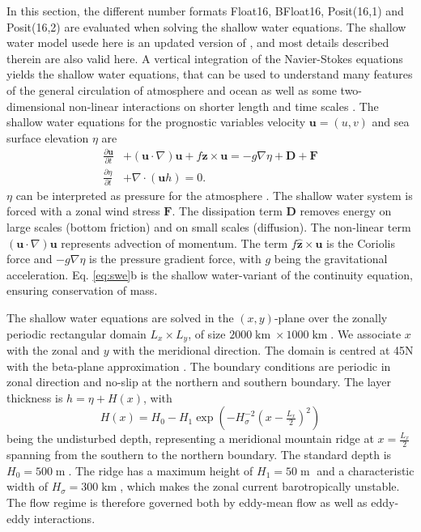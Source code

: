\documentclass[draft]{agujournal2019}
\newcommand{\op}{\operatorname}
\begin{document}
In this section, the different number formats Float16, BFloat16, Posit(16,1) and
Posit(16,2) are evaluated when solving the shallow water equations. The shallow
water model usede here is an updated version of , and most details
described therein are also valid here. A vertical integration of the Navier-Stokes
equations yields the shallow water equations, that can be used to understand
many features of the general circulation of atmosphere and ocean as well as
some two-dimensional non-linear interactions on shorter length and time scales
\cite{Gill1982,Vallis2006}. The shallow water equations for the prognostic variables
velocity $\mathbf{u} = (u,v)$ and sea surface elevation $\eta$ are
\begin{subequations}
\begin{align}
\frac{\partial \mathbf{u}}{\partial t} &+ (\mathbf{u} \cdot \nabla) \mathbf{u} +
f\hat{\mathbf{z}} \times \mathbf{u} = -g\nabla \eta + \mathbf{D} + \mathbf{F} \\
\frac{\partial \eta}{\partial t} &+ \nabla \cdot (\mathbf{u}h) = 0.
\end{align}
\label{eq:swe}%
\end{subequations}
$\eta$ can be interpreted as pressure for the atmosphere \cite{Gill1982}.
The shallow water system is forced with a zonal wind stress $\mathbf{F}$.
The dissipation term $\mathbf{D}$ removes energy on large scales (bottom friction)
and on small scales (diffusion). The non-linear term $(\mathbf{u} \cdot \nabla) \mathbf{u}$
represents advection of momentum. The term $f\hat{\mathbf{z}} \times \mathbf{u}$
is the Coriolis force and $-g\nabla \eta$ is the pressure gradient force, with
$g$ being the gravitational acceleration. Eq. \ref{eq:swe}b is the shallow
water-variant of the continuity equation, ensuring conservation of mass.

The shallow water equations are solved in the $(x,y)$-plane over the zonally periodic
rectangular domain $L_x \times L_y$, of size $2000\op{km} \times 1000\op{km}$.
We associate $x$ with the zonal and $y$ with the meridional direction. The domain
is centred at 45N with the beta-plane approximation \cite{Vallis2006}. The boundary
conditions are periodic in zonal direction and no-slip at the northern and southern
boundary. The layer thickness is $h = \eta + H(x)$, with
\begin{equation}
H(x) = H_0 - H_1\exp\left(-H_\sigma^{-2}(x-\tfrac{L_x}{2})^2\right)
\end{equation}
being the undisturbed depth, representing a meridional mountain ridge at
$x=\tfrac{L_x}{2}$ spanning from the southern to the northern boundary.
The standard depth is $H_0 = 500\op{m}$. The ridge has a maximum height of
$H_1 = 50\op{m}$ and a characteristic width of $H_\sigma = 300\op{km}$, which
makes the zonal current barotropically unstable. The flow regime is therefore
governed both by eddy-mean flow as well as eddy-eddy interactions.
\end{document}
